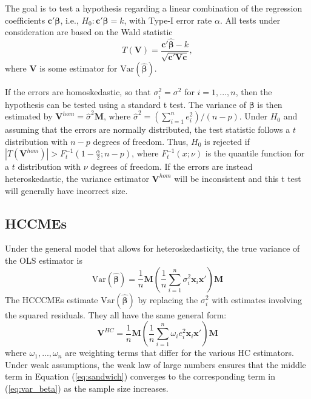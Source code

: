\documentclass[12pt]{article}\usepackage[]{graphicx}\usepackage[]{color}
\newcommand{\Var}{\text{Var}}
\newcommand{\bm}{\mathbf}
\newcommand{\bs}{\boldsymbol}
\begin{document}
The goal is to test a hypothesis regarding a linear combination of the regression coefficients $\bm{c}'\bs\beta$, i.e., $H_0: \bm{c}'\bs\beta = k$, with Type-I error rate $\alpha$. 
All tests under consideration are based on the Wald statistic
\begin{equation}
T(\bm{V}) = \frac{\bm{c}'\bs{\hat\beta} - k}{\sqrt{\bm{c}' \bm{V} \bm{c}}},
\end{equation}
where $\bm{V}$ is some estimator for $\Var\left(\bs{\hat\beta}\right)$. 

If the errors are homoskedastic, so that $\sigma_i^2 = \sigma^2$ for $i = 1,...,n$, then the hypothesis can be tested using a standard t test. 
The variance of $\bs\beta$ is then estimated by $\bm{V}^{hom} = \hat\sigma^2 \bm{M}$, where $\hat\sigma^2 = \left(\sum_{i=1}^n e_i^2\right) / (n - p)$. 
Under $H_0$ and assuming that the errors are normally distributed, the test statistic follows a $t$ distribution with $n - p$ degrees of freedom. 
Thus, $H_0$ is rejected if $\left|T\left(\bm{V}^{hom}\right)\right| > F_t^{-1}\left(1 - \frac{\alpha}{2}; n - p\right)$, where $F_t^{-1}(x; \nu)$ is the quantile function for a $t$ distribution with $\nu$ degrees of freedom. 
If the errors are instead heteroskedastic, the variance estimator $\bm{V}^{hom}$ will be inconsistent and this t test will generally have incorrect size. 

\subsection{HCCMEs}

Under the general model that allows for heteroskedasticity, the true variance of the OLS estimator is 
\begin{equation}
\label{eq:var_beta}
\Var\left(\bs{\hat\beta}\right) = \frac{1}{n} \bm{M} \left(\frac{1}{n}\sum_{i=1}^n \sigma_i^2 \bm{x}_i\bm{x}'\right) \bm{M}
\end{equation}
The HCCCMEs estimate $\Var\left(\bs{\hat\beta}\right)$ by replacing the $\sigma_i^2$ with estimates involving the squared residuals. They all have the same general form:  
\begin{equation}
\label{eq:sandwich}
\bm{V}^{HC} = \frac{1}{n} \bm{M} \left(\frac{1}{n}\sum_{i=1}^n \omega_i e_i^2 \bm{x}_i\bm{x}'\right)\bm{M} 
\end{equation}
where $\omega_{1},...,\omega_{n}$ are weighting terms that differ for the various HC estimators. 
Under weak assumptions, the weak law of large numbers ensures that the middle term in Equation (\ref{eq:sandwich}) converges to the corresponding term in (\ref{eq:var_beta}) as the sample size increases. 
\end{document}
